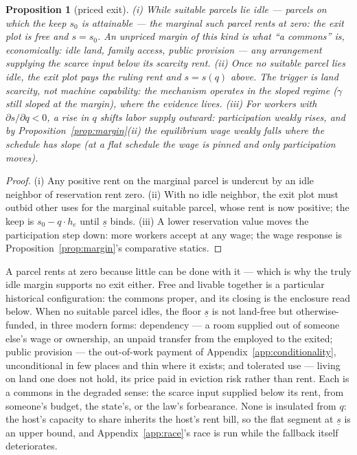 \documentclass[12pt]{article}
\theoremstyle{plain}
\newtheorem{proposition}{Proposition}
\begin{document}
\begin{proposition}[priced exit]\label{prop:exit}
(i) While suitable parcels lie idle --- parcels on which the keep $s_0$ is attainable --- the marginal such parcel rents at zero: the exit plot is free and $s = s_0$. An unpriced margin of this kind is what ``a commons'' is, economically: idle land, family access, public provision --- any arrangement supplying the scarce input below its scarcity rent. (ii) Once no suitable parcel lies idle, the exit plot pays the ruling rent and $s = s(q)$ above. The trigger is land scarcity, not machine capability: the mechanism operates in the sloped regime ($\gamma$ still sloped at the margin), where the evidence lives. (iii) For workers with $\partial s/\partial q < 0$, a rise in $q$ shifts labor supply outward: participation weakly rises, and by Proposition~\ref{prop:margin}(ii) the equilibrium wage weakly falls where the schedule has slope (at a flat schedule the wage is pinned and only participation moves).
\end{proposition}

\begin{proof}
(i) Any positive rent on the marginal parcel is undercut by an idle neighbor of reservation rent zero. (ii) With no idle neighbor, the exit plot must outbid other uses for the marginal suitable parcel, whose rent is now positive; the keep is $s_0 - q\cdot h_e$ until $\underline{s}$ binds. (iii) A lower reservation value moves the participation step down: more workers accept at any wage; the wage response is Proposition~\ref{prop:margin}'s comparative statics.
\end{proof}

A parcel rents at zero because little can be done with it --- which is why the truly idle margin supports no exit either. Free and livable together is a particular historical configuration: the commons proper, and its closing is the enclosure read below. When no suitable parcel idles, the floor $\underline{s}$ is not land-free but otherwise-funded, in three modern forms: dependency --- a room supplied out of someone else's wage or ownership, an unpaid transfer from the employed to the exited; public provision --- the out-of-work payment of Appendix~\ref{app:conditionality}, unconditional in few places and thin where it exists; and tolerated use --- living on land one does not hold, its price paid in eviction risk rather than rent. Each is a commons in the degraded sense: the scarce input supplied below its rent, from someone's budget, the state's, or the law's forbearance. None is insulated from $q$: the host's capacity to share inherits the host's rent bill, so the flat segment at $\underline{s}$ is an upper bound, and Appendix~\ref{app:race}'s race is run while the fallback itself deteriorates.
\end{document}
